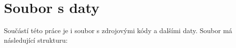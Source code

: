 \appendix
\section{Soubor s daty}
Součástí této práce je i soubor  s zdrojovými kódy a dalšími daty. Soubor má následující strukturu:

\notFinished

